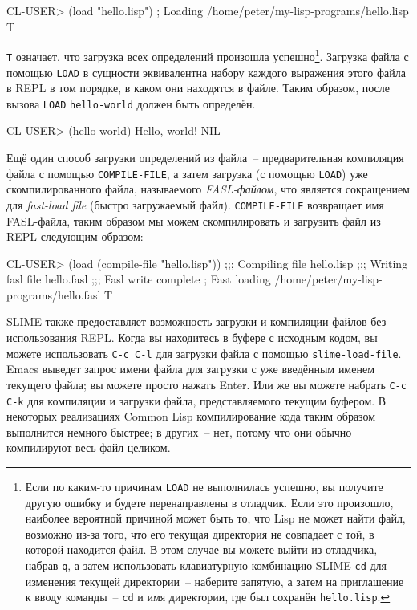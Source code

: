 \begin{myverb}
CL-USER> (load "hello.lisp")
; Loading /home/peter/my-lisp-programs/hello.lisp
T
\end{myverb}

\lstinline{T} означает, что загрузка всех определений произошла успешно\footnote{Если по каким-то
  причинам \lstinline{LOAD} не выполнилась успешно, вы получите другую ошибку и будете перенаправлены
  в отладчик. Если это произошло, наиболее вероятной причиной может быть то, что Lisp не
  может найти файл, возможно из-за того, что его текущая директория не совпадает с той, в
  которой находится файл. В этом случае вы можете выйти из отладчика, набрав \texttt{q}, а затем
  использовать клавиатурную комбинацию SLIME \texttt{cd} для изменения текущей директории~--
  наберите запятую, а затем на приглашение к вводу команды~-- \texttt{cd} и имя директории, где был
  сохранён \texttt{hello.lisp}.}. Загрузка файла с помощью \lstinline{LOAD} в сущности эквивалентна набору
каждого выражения этого файла в REPL в том порядке, в каком они находятся в файле. Таким
образом, после вызова \lstinline{LOAD} \lstinline{hello-world} должен быть определён.

\begin{myverb}
CL-USER> (hello-world)
Hello, world!
NIL
\end{myverb}

Ещё один способ загрузки определений из файла~-- предварительная компиляция файла с помощью
\lstinline{COMPILE-FILE}, а затем загрузка (с помощью \lstinline{LOAD}) уже скомпилированного файла, называемого
\emph{FASL-файлом}, что является сокращением для \emph{fast-load file} (быстро загружаемый
файл). \lstinline{COMPILE-FILE} возвращает имя FASL-файла, таким образом мы можем скомпилировать и
загрузить файл из REPL следующим образом:

\begin{myverb}
CL-USER> (load (compile-file "hello.lisp"))
;;; Compiling file hello.lisp
;;; Writing fasl file hello.fasl
;;; Fasl write complete
; Fast loading /home/peter/my-lisp-programs/hello.fasl
T
\end{myverb}

SLIME также предоставляет возможность загрузки и компиляции файлов без использования
REPL. Когда вы находитесь в буфере с исходным кодом, вы можете использовать \texttt{C-c C-l} для
загрузки файла с помощью \texttt{slime-load-file}. Emacs выведет запрос имени файла для загрузки с
уже введённым именем текущего файла; вы можете просто нажать Enter. Или же вы можете
набрать \texttt{C-c C-k} для компиляции и загрузки файла, представляемого текущим буфером. В
некоторых реализациях Common Lisp компилирование кода таким образом выполнится немного
быстрее; в других~-- нет, потому что они обычно компилируют весь файл целиком.

